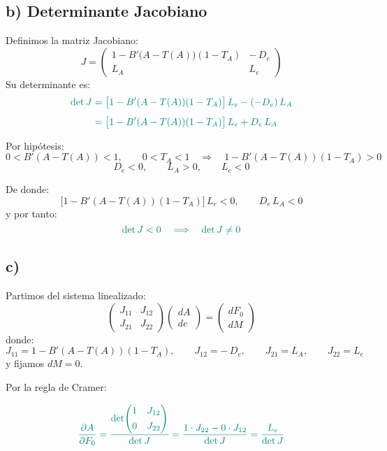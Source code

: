 \documentclass{article}
\begin{document}
\subsection*{b) Determinante Jacobiano}

Definimos la matriz Jacobiano:
\[
J =
\begin{pmatrix}
1 - B'\bigl(A - T(A)\bigr)(1 - T_A) & -\,D_e\\[6pt]
L_A & L_e
\end{pmatrix}
\]
Su determinante es:
\[
\color{teal}
\begin{aligned}
\det J
&= \bigl[1 - B'(A - T(A))(1 - T_A)\bigr]\,L_e - (-D_e)\,L_A\\[4pt]
&= \bigl[1 - B'(A - T(A))(1 - T_A)\bigr]\,L_e + D_e\,L_A
\end{aligned}
\]

Por hipótesis:
\[
0 < B'(A - T(A)) < 1,
\qquad
0 < T_A < 1
\quad\Longrightarrow\quad
1 - B'(A - T(A))(1 - T_A) > 0
\]
\[
D_e < 0,
\qquad
L_A > 0,
\qquad
L_e < 0
\]

De donde:
\[
\bigl[1 - B'(A - T(A))(1 - T_A)\bigr]\,L_e < 0,
\qquad
D_e\,L_A < 0
\]
y por tanto:
\[
\color{teal}
\det J < 0
\quad\Longrightarrow\quad
\det J \neq 0
\]

\subsection*{c)}

Partimos del sistema linealizado:
\[
\begin{pmatrix}
J_{11} & J_{12}\\[4pt]
J_{21} & J_{22}
\end{pmatrix}
\begin{pmatrix}
dA\\[4pt]
de
\end{pmatrix}
=
\begin{pmatrix}
dF_0\\[4pt]
dM
\end{pmatrix}
\]
donde:
\[
J_{11} = 1 - B'(A - T(A))(1 - T_A),
\qquad
J_{12} = -\,D_e,
\qquad
J_{21} = L_A,
\qquad
J_{22} = L_e
\]
y fijamos \(dM = 0\).

Por la regla de Cramer:

\[
\color{teal}
\frac{\partial A}{\partial F_0}
= \frac{
\det\!\begin{pmatrix}
1 & J_{12}\\[4pt]
0 & J_{22}
\end{pmatrix}
}{\det J}
= \frac{1\cdot J_{22} - 0\cdot J_{12}}{\det J}
= \frac{L_e}{\det J}
\]
\end{document}
